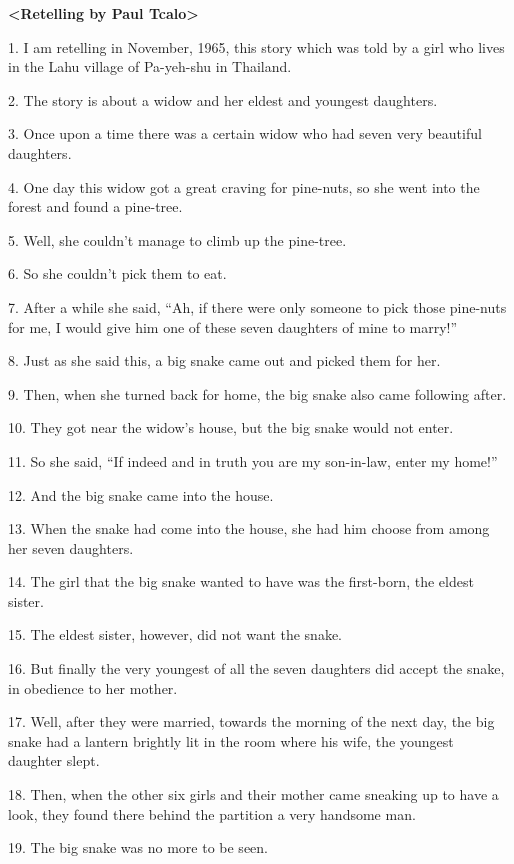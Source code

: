 \setcounter{footnote}{0}

\textbf{<Retelling by Paul Tcalo>}

1. I am retelling in November, 1965, this story which was told by a girl who lives
in the Lahu village of Pa-yeh-shu in Thailand.

2. The story is about a widow and her eldest and youngest daughters.

3. Once upon a time there was a certain widow who had seven very beautiful daughters.

4. One day this widow got a great craving for pine-nuts, so she went into the forest
and found a pine-tree.

5. Well, she couldn't manage to climb up the pine-tree.

6. So she couldn't pick them to eat.

7. After a while she said, ``Ah, if there were only someone to pick those
pine-nuts for me, I would give him one of these seven daughters of mine to marry!''

8. Just as she said this, a big snake came out and picked them for her.

9. Then, when she turned back for home, the big snake also came following after.

10. They got near the widow's house, but the big snake would not enter.

11. So she said, ``If indeed and in truth you are my son-in-law, enter
my home!''

12. And the big snake came into the house.

13. When the snake had come into the house, she had him choose from among her seven
daughters.

14. The girl that the big snake wanted to have was the first-born, the eldest sister.

15. The eldest sister, however, did not want the snake.

16. But finally the very youngest of all the seven daughters did accept the snake,
in obedience to her mother.

17. Well, after they were married, towards the morning of the next day, the big
snake had a lantern brightly lit in the room where his wife, the youngest daughter
slept.

18. Then, when the other six girls and their mother came sneaking up to have a
look, they found there behind the partition a very handsome man.

19. The big snake was no more to be seen.

